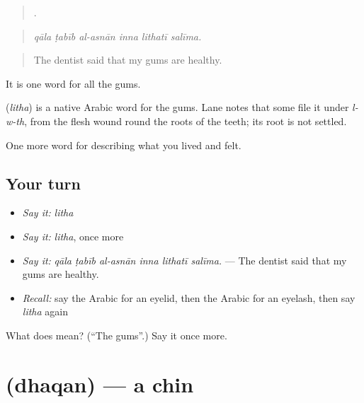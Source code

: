 \begin{quote}
     .
\end{quote}

\begin{quote}
\emph{qāla ṭabīb al-asnān inna lithatī salīma.}
\end{quote}

\begin{quote}
The dentist said that my gums are healthy.
\end{quote}

It is one word for all the gums.

\begin{cousinweb}
\textbf{} (\emph{litha}) is a native Arabic word for the gums. Lane notes that some file it under \emph{l-w-th}, from the flesh wound round the roots of the teeth; its root is not settled.
\end{cousinweb}

\begin{grammarlens}[title={What you've built}]
One more word for describing what you lived and felt.
\end{grammarlens}

\subsection*{Your turn}
\begin{itemize}
\raggedright
  \item \emph{Say it:} \emph{litha}
  \item \emph{Say it:} \emph{litha}, once more
  \item \emph{Say it:} \emph{qāla ṭabīb al-asnān inna lithatī salīma.} — The dentist said that my gums are healthy.
  \item \emph{Recall:} say the Arabic for an eyelid, then the Arabic for an eyelash, then say \emph{litha} again
\end{itemize}

\begin{tcolorbox}[breakable,colback=teal!4,colframe=teal!35!black,title={Before you move on}]
What does  mean? (\textquotedblleft{}The gums\textquotedblright{}.) Say it once more.
\end{tcolorbox}
\section[\texorpdfstring{\ar{ذقن} (dhaqan)}{ذقن (dhaqan)}]{ (dhaqan) — a chin}

